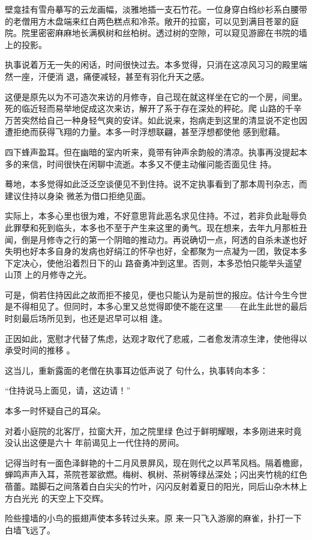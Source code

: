 \documentclass{article}
\begin{document}
壁龛挂有雪舟摹写的云龙画幅，淡雅地插一支石竹花。一位身穿白绉纱衫系白腰带的老僧用方木盘端来红白两色糕点和冷茶。敞开的拉窗，可以见到满目苍翠的庭院。院里密密麻麻地长满枫树和丝柏树。透过树的空隙，可以窥见游廊在书院的墙上的投影。

执事说着万无一失的闲话，时间很快过去。本多觉得，只消在这凉风习习的殿里端然一座，汗便消
退，痛便减轻，甚至有羽化升天之感。 

这便是原先以为不可造次来访的月修寺，自己现在就这样坐在它的一个房，间里。死的临近轻而易举地促成这次来访，解开了系于存在深处的秤砣。爬
\newpage
山路的千辛万苦突然给自己一种身轻气爽的安详。如此说来，抱病走到这里的清显说不定也因遭拒绝而获得飞翔的力量。本多一时浮想联翩，甚至浮想都使他
感到慰藉。 

四下蜂声盈耳。但在幽暗的室内听来，竟带有钟声余韵般的清凉。执事再没提起本多的来信，时间很快在闲聊中流逝。本多又不便主动催问能否面见住
持。 

蓦地，本多觉得如此泛泛空谈便见不到住持。说不定执事看到了那本周刊杂志，而建议住持以身染
微恙为借口拒绝见面。 

实际上，本多心里也很为难，不好意思背此恶名求见住持。不过，若非负此耻辱负此罪孽和死到临头，本多也不至于产生来这里的勇气。现在想来，去年九月那桩丑闻，倒是月修寺之行的第一个阴暗的推动力。再说确切一点，阿透的自杀未遂也好失明也好本多自身的发病也好绢江的怀孕也好，全都聚为一点凝为一团，敦促本多下定决心，使他沿着烈日下的山
\newpage
路奋勇冲到这里。否则，本多恐怕只能举头遥望山顶
上的月修寺之光。 

可是，倘若住持因此之故而拒不接见，便也只能认为是前世的报应。估计今生今世是不得相见了。但同时，本多心里又总觉得即使不能在这里——在此生此世的最后时刻最后场所见到，也还是迟早可以相
逢。 

正因如此，宽慰才代替了焦虑，达观才取代了悲戚，二者愈发清凉生津，使他得以承受时间的推移
。 

这当儿，重新露面的老僧在执事耳边低声说了
句什么，执事转向本多： 


“住持说马上面见，请，这边请！” 


本多一时怀疑自己的耳朵。 

对着小庭院的北客厅，拉窗大开，加之院里绿
\newpage
色过于鲜明耀眼，本多刚进来时竟没认出这便是六十
年前谒见上一代住持的房间。 

记得当时有一面色泽鲜艳的十二月风景屏风，现在则代之以芦苇风档。隔着檐廊，蝉鸣声声入耳，茶院苍翠欲燃。梅树、枫树、茶树等绿丛深处；闪出夹竹桃的红色蓓蕾。踏脚石之间落着白白尖尖的竹叶，闪闪反射着夏日的阳光，同后山杂木林上方白光光
的天空上下交辉。 

险些撞墙的小鸟的振翅声使本多转过头来。原
来一只飞入游廓的麻雀，扑打一下白墙飞远了。 
\end{document}
